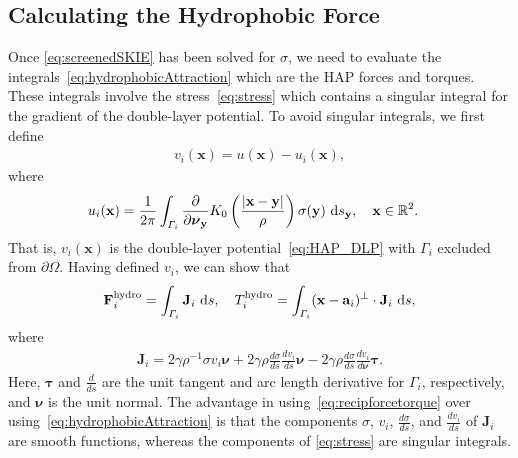 \documentclass[lineno]{jfm}
\renewcommand{\aa}{\mathbf{a}}
\newcommand{\bd}{\partial}
\newcommand{\FF}{\mathbf{F}}
\newcommand{\JJ}{\mathbf{J}}
\newcommand{\nnu}{\boldsymbol{\nu}}
\newcommand{\ttau}{\boldsymbol{\tau}}
\newcommand{\xx}{\mathbf{x}}
\newcommand{\yy}{\mathbf{y}}
\newcommand{\pderiv}[2]{\frac{\partial #1}{\partial #2}}
\begin{document}
\subsection{Calculating the Hydrophobic Force}
\label{subsec:calculating_force}
Once \eqref{eq:screenedSKIE} has been solved for $\sigma$, we need to
evaluate the integrals~\eqref{eq:hydrophobicAttraction} which are the
HAP forces and torques. These integrals involve the
stress~\eqref{eq:stress} which contains a singular integral for the
gradient of the double-layer potential. To avoid singular integrals, we
first define
\begin{align}
  \label{eq:uidef}
  v_i(\xx) = u(\xx) - u_i(\xx),
\end{align}
where
\begin{align}
  u_i(\xx) &= \frac{1}{2\pi} \int_{\Gamma_i} \pderiv{}{\nnu_\yy}
    K_0 \left(\frac{|\xx - \yy|}{\rho}\right) \sigma(\yy) \, \dif s_\yy,
    \quad \xx \in \mathbb{R}^2.
\end{align}
That is, $v_i(\xx)$ is the double-layer potential~\eqref{eq:HAP_DLP}
with $\Gamma_i$ excluded from $\bd\Omega$. Having defined $v_i$, we can
show that
\begin{align}
  \label{eq:recipforcetorque}
  \FF_i^{\text{hydro}} = \int_{\Gamma_i} \JJ_i \,\dif s,\quad
  T_i^{\text{hydro}}    = \int_{\Gamma_i} 
    (\xx - \aa_i)^{\perp} \cdot \JJ_i  \,\dif s,
\end{align}
where
\begin{align}
  \label{eq:jumpstress1}
  \JJ_{i} = 2\gamma\rho^{-1} \sigma v_i \nnu + 
    2\gamma\rho \frac{d\sigma}{ds} \frac{dv_i}{ds} \nnu -
    2\gamma\rho \frac{d\sigma}{ds} \frac{dv_i}{d\nnu} \ttau.
\end{align}
Here, $\ttau$ and $\frac{d}{ds}$ are the unit tangent and arc length
derivative for $\Gamma_i$, respectively, and $\nnu$ is the unit normal.
The advantage in using~\eqref{eq:recipforcetorque} over
using~\eqref{eq:hydrophobicAttraction} is that the components $\sigma$,
$v_i$, $\frac{d\sigma}{ds}$, and $\frac{dv_i}{ds}$ of $\JJ_i$ are smooth
functions, whereas the components of \eqref{eq:stress} are singular
integrals. 
\end{document}
